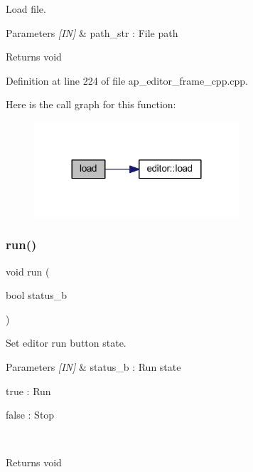 Load file. 


\begin{DoxyParams}{Parameters}
{\em \mbox{[}\+I\+N\mbox{]}} & path\+\_\+str \+: File path \\
\hline
\end{DoxyParams}
\begin{DoxyReturn}{Returns}
void 
\end{DoxyReturn}


Definition at line 224 of file ap\+\_\+editor\+\_\+frame\+\_\+cpp.\+cpp.

Here is the call graph for this function\+:
\nopagebreak
\begin{figure}[H]
\begin{center}
\leavevmode
\includegraphics[width=216pt]{group___script__editor_ga8caf41718ffb5bf060de703f18f72546_cgraph}
\end{center}
\end{figure}
\mbox{\label{group___script__editor_ga7f023340b8930afdb091542b289c015b}} 
\subsubsection{run()}
{\footnotesize\ttfamily void run (\begin{DoxyParamCaption}\item[{bool}]{status\+\_\+b }\end{DoxyParamCaption})}



Set editor run button state. 


\begin{DoxyParams}{Parameters}
{\em \mbox{[}\+I\+N\mbox{]}} & status\+\_\+b \+: Run state \begin{DoxyItemize}
\item true \+: Run \item false \+: Stop \end{DoxyItemize}
\\
\hline
\end{DoxyParams}
\begin{DoxyReturn}{Returns}
void 
\end{DoxyReturn}


